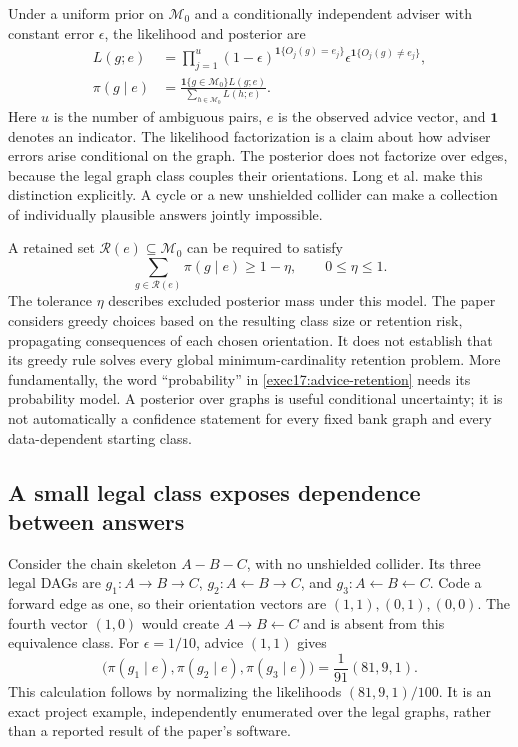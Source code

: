 Under a uniform prior on $\mathcal M_0$ and a conditionally independent adviser
with constant error $\epsilon$, the likelihood and posterior are
\begin{equation}
\begin{split}
 L(g;e)&=\prod_{j=1}^{u}(1-\epsilon)^{\mathbf 1\{O_j(g)=e_j\}}
                   \epsilon^{\mathbf 1\{O_j(g)\ne e_j\}},\\
 \pi(g\mid e)&=\frac{\mathbf 1\{g\in\mathcal M_0\}L(g;e)}
                        {\sum_{h\in\mathcal M_0}L(h;e)}.
\end{split}
\label{exec17:advice-posterior}
\end{equation}
Here $u$ is the number of ambiguous pairs, $e$ is the observed advice vector,
and $\mathbf 1$ denotes an indicator. The likelihood factorization is a claim
about how adviser errors arise conditional on the graph. The posterior does
not factorize over edges, because the legal graph class couples their
orientations. Long et al. make this distinction explicitly. A cycle or a new
unshielded collider can make a collection of individually plausible answers
jointly impossible.\citep{exec17_imperfect_experts}

A retained set $\mathcal R(e)\subseteq\mathcal M_0$ can be required to satisfy
\begin{equation}
 \sum_{g\in\mathcal R(e)}\pi(g\mid e)\geq 1-\eta,
 \qquad 0\leq\eta\leq1.
\label{exec17:advice-retention}
\end{equation}
The tolerance $\eta$ describes excluded posterior mass under this model.
The paper considers greedy choices based on the resulting class size or
retention risk, propagating consequences of each chosen orientation. It does
not establish that its greedy rule solves every global minimum-cardinality
retention problem. More fundamentally, the word ``probability'' in
\eqref{exec17:advice-retention} needs its probability model. A posterior over
graphs is useful conditional uncertainty; it is not automatically a
confidence statement for every fixed bank graph and every data-dependent
starting class.

\subsection{A small legal class exposes dependence between answers}

Consider the chain skeleton $A-B-C$, with no unshielded collider. Its three
legal DAGs are $g_1:A\to B\to C$, $g_2:A\leftarrow B\to C$, and
$g_3:A\leftarrow B\leftarrow C$. Code a forward edge as one, so their
orientation vectors are $(1,1),(0,1),(0,0)$. The fourth vector $(1,0)$ would
create $A\to B\leftarrow C$ and is absent from this equivalence class.
For $\epsilon=1/10$, advice $(1,1)$ gives
\begin{equation}
 \bigl(\pi(g_1\mid e),\pi(g_2\mid e),\pi(g_3\mid e)\bigr)
       =\frac{1}{91}(81,9,1).
\label{exec17:advice-chain}
\end{equation}
This calculation follows by normalizing the likelihoods
$(81,9,1)/100$. It is an exact project example, independently enumerated over
the legal graphs, rather than a reported result of the paper's software.
\citep{exec17_advice_validity_exact}

